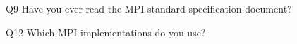 \begin{description}%
\item{Q9} Have you ever read the MPI standard specification document?%
\item{Q12} Which MPI implementations do you use?%
\end{description}%
